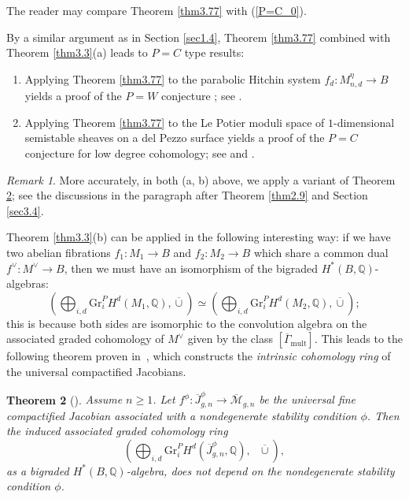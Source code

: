 \documentclass[11pt]{amsart}
\theoremstyle{plain}
\newtheorem{thm}{Theorem}[section]
\theoremstyle{definition}
\theoremstyle{remark}
\newtheorem{rmk}[thm]{Remark}
\newcommand{\BQ}{{\mathbb{Q}}}
\newcommand{\CM}{{\mathcal M}}
\begin{document}
The reader may compare Theorem \ref{thm3.77} with (\ref{P=C_0}).

By a similar argument as in Section \ref{sec1.4}, Theorem \ref{thm3.77} combined with Theorem \ref{thm3.3}(a) leads to $P=C$ type results:
\begin{enumerate}
    \item[(a)] Applying Theorem \ref{thm3.77} to the parabolic Hitchin system $f_d: M^\eta_{n,d} \to B$ yields a proof of the $P=W$ conjecture \cite{dCHM, MS_PW, HMMS}; see \cite[Proof of Theorem 0.4]{MSY}.
    \item[(b)] Applying Theorem \ref{thm3.77} to the Le Potier moduli space of $1$-dimensional semistable sheaves on a del Pezzo surface yields a proof of the $P=C$ conjecture \cite{KPS, KLMP} for low degree cohomology; see \cite[Theorem 0.6]{MSY} and \cite[Theorems 0.3 and 0.6]{PSSZ}.
\end{enumerate}

\begin{rmk}
    More accurately, in both (a, b) above, we apply a variant of Theorem \ref{thm3.7}; see the discussions in the paragraph after Theorem \ref{thm2.9} and Section \ref{sec3.4}.
\end{rmk}
\medskip
{} Theorem \ref{thm3.3}(b) can be applied in the following interesting way: if we have two abelian fibrations $f_1: M_1 \to B$ and $f_2: M_2 \to B$ which share a common dual $f^\vee: M^\vee \to B$, then we must have an isomorphism of the bigraded $H^*(B, \BQ)$-algebras:
\[
\left(\bigoplus_{i,d} \mathrm{Gr}^P_iH^d(M_1, \BQ), \overline{\cup} \right) \simeq \left(\bigoplus_{i,d} \mathrm{Gr}^P_iH^d(M_2, \BQ), \overline{\cup} \right);
\]
this is because both sides are isomorphic to the convolution algebra on the associated graded cohomology of $M^\vee$ given by the class $[\overline{\Gamma}_{\mathrm{mult}}]$. This leads to the following theorem proven in~\cite[Theorem 0.6]{BMSY2}, which constructs the \emph{intrinsic cohomology ring} of the universal compactified Jacobians.

\begin{thm}[\cite{BMSY2}]\label{thm3.7}
   Assume $n\geq 1$. Let $f^\phi: \overline{J}^\phi_{g,n} \to \overline{\CM}_{g,n}$ be the universal fine compactified Jacobian associated with a nondegenerate stability condition $\phi$. Then the induced associated graded cohomology ring
   \[
\left(\bigoplus_{i,d} \mathrm{Gr}^P_iH^d(\overline{J}^\phi_{g,n}, \BQ),~~~ \overline{\cup} \right),
\]
as a bigraded $H^*(B, \BQ)$-algebra, does not depend on the nondegenerate stability condition $\phi$.
\end{thm}
\end{document}
